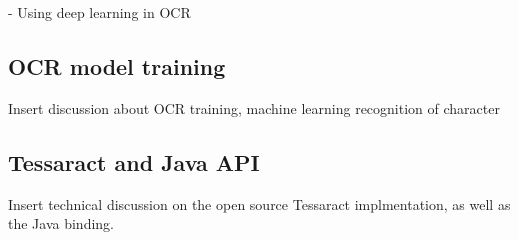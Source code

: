 - Using deep learning in OCR

\subsection{OCR model training}

Insert discussion about OCR training, machine learning recognition of character

\subsection{Tessaract and Java API}

Insert technical discussion on the open source Tessaract implmentation, as well as the Java binding.

\clearpage %
